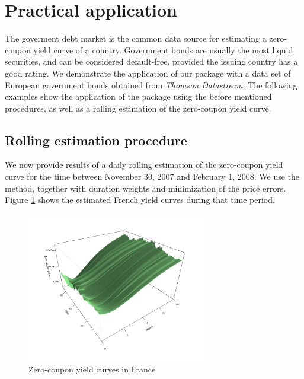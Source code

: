 \section{Practical application}
\label{sec:pract-appl}

The goverment debt market is the common data source for estimating a zero-coupon yield curve of a country. Government bonds are usually the most liquid securities, and can be considered default-free, provided the issuing country has a good rating. We demonstrate the application of our package with a data set of European government bonds obtained from \emph{Thomson Datastream}\texttrademark. The following examples show the application of the package using the before mentioned procedures, as well as a rolling estimation of the zero-coupon yield curve.




\subsection{Rolling estimation procedure}
\label{sec:rolling-estim}

We now provide results of a daily rolling estimation of the zero-coupon yield curve for the time between November 30, 2007 and February 1, 2008. We use the \cite{Svensson1994} method, together with duration weights and minimization of the price errors. Figure \ref{fig:3dplot} shows the estimated French yield curves during that time period.

\begin{figure}[htb]
  \begin{center}
\includegraphics[width=0.7\textwidth]{3dplot}
  \caption{Zero-coupon yield curves in France}
  \label{fig:3dplot}
\end{center}
\end{figure}

